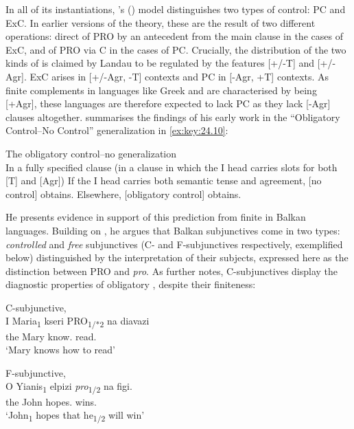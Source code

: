 \documentclass[output=paper]{langsci/langscibook}
\begin{document}
In all of its instantiations, \citeauthor{Landau2000}'s
(\citeyear{Landau2000,Landau2004,Landau2015}) model distinguishes two types of
control: \gls{PC} and
\gls{ExC}. In earlier versions of the theory,
these are the result of two different operations: direct  of PRO by an
antecedent from the main clause in the cases of \gls{ExC}, and  of PRO via C in the cases of PC. Crucially, the
distribution of the two kinds of  is claimed by Landau to be regulated
by the features [+/-T] and [+/-Agr]. \gls{ExC}
arises in [+/-Agr, -T] contexts and \gls{PC} in
[-Agr, +T] contexts. As finite complements in languages like Greek and 
are characterised by being [+Agr], these languages are therefore expected to
lack \gls{PC} as they lack [-Agr] clauses
altogether.  \citet[7]{Landau2015} summarises the findings of his early work in
the “Obligatory Control--No Control” generalization in \eqref{ex:key:24.10}:

\ea\label{ex:key:24.10} The obligatory control--no  generalization\\
In a fully specified clause (in a clause in which the I head carries slots for both [T] and [Agr])
	\ea If the I head carries both semantic tense and agreement, [no control] obtains.
	\ex Elsewhere, [obligatory control] obtains.
	\z
\z

He presents evidence in support of this prediction from finite  in
Balkan languages. Building on \citet{Varlokosta1994}, he argues that Balkan
subjunctives come in two types: \emph{controlled} and \emph{free} subjunctives
(C- and F-subjunctives respectively, exemplified below) distinguished by the
interpretation of their subjects, expressed here as the distinction between PRO
and \emph{pro}. As \citet[827]{Landau2004} further notes, C-subjunctives
display the diagnostic properties of obligatory , despite their
finiteness:

\ea\label{ex:key:24.11} C-subjunctive, \\
    \gll I Maria\textsubscript{1}   kseri PRO\textsubscript{1/*2} na   diavazi \\
		the Mary   know.\Tsg{} {}  \Ptcl{}   read.\Tsg{}\\
	\glt ‘Mary knows how to read’
\z

\ea\label{ex:key:24.12} F-subjunctive,  \parencite[(21)]{Varlokosta1994}\\
	\gll O Yianis\textsubscript{1}   elpizi  \emph{pro}\textsubscript{1/2} na   figi. \\
		the John   hopes.\Tsg{} {}    \Ptcl{}   wins.\Tsg{} \\
	\glt ‘John\textsubscript{1} hopes that he\textsubscript{1/2} will win’
\z
\end{document}
